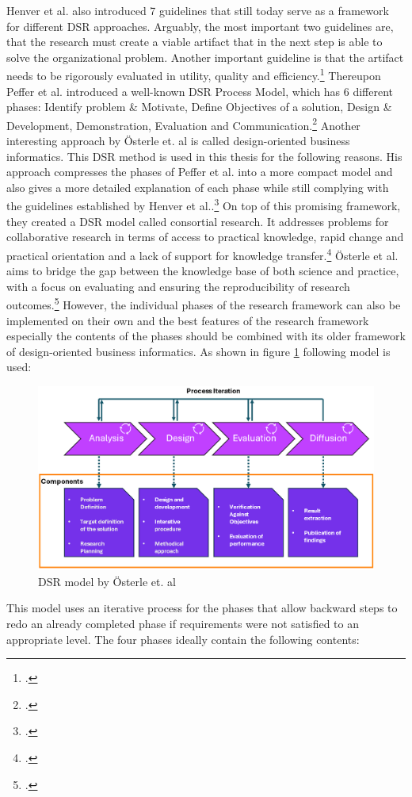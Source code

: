 Henver et al. also introduced 7 guidelines that still today serve as a framework for different \ac{DSR} approaches.
Arguably, the most important two guidelines are, that the research must create a viable artifact that in the next step is able to solve the organizational problem. 
Another important guideline is that the artifact needs to be rigorously evaluated in utility, quality and efficiency.\footcite[83]{hevnerDesignScienceInformation2004a}
Thereupon Peffer et al. introduced a well-known \ac{DSR} Process Model, which has 6 different phases: Identify problem \& Motivate, Define Objectives of a solution, 
Design \& Development, Demonstration, Evaluation and Communication.\footcite[cf.][54]{peffersDesignScienceResearch2007a}
Another interesting approach by Österle et. al is called design-oriented business informatics. 
This \ac{DSR} method is used in this thesis for the following reasons.
His approach compresses the phases of Peffer et al. into a more compact model and also gives a more detailed explanation of each phase while still complying with the guidelines established by Henver et al..\footcite[cf.][1-6]{oesterleMemorandumZurGestaltungsorientierten2010}
On top of this promising framework, they created a \ac{DSR} model called consortial research.
It addresses problems for collaborative research in terms of access to practical knowledge, rapid change and practical orientation and a lack of support for knowledge transfer.\footcite[cf.][273-274]{oesterleKonsortialforschung2010}
Österle et al. aims to bridge the gap between the knowledge base of both science and practice, with a focus on evaluating and ensuring the reproducibility of research outcomes.\footcite[cf.][5]{oesterleMemorandumZurGestaltungsorientierten2010}
However, the individual phases of the research framework can also be implemented on their own and the best features 
of the research framework especially the contents of the phases should be combined with its older framework of design-oriented business informatics.
As shown in figure \ref{DSR_Modell} following model is used:
\begin{figure}[H]
    \centering
    \includegraphics[width=0.9\linewidth]{graphics/DSR_Modell.png}
    \caption{DSR model by Österle et. al\protect\footnotemark}
    \label{DSR_Modell}
\end{figure}
This model uses an iterative process for the phases that allow backward steps to redo an already completed phase if requirements were not satisfied to an appropriate level.
The four phases ideally contain the following contents:

